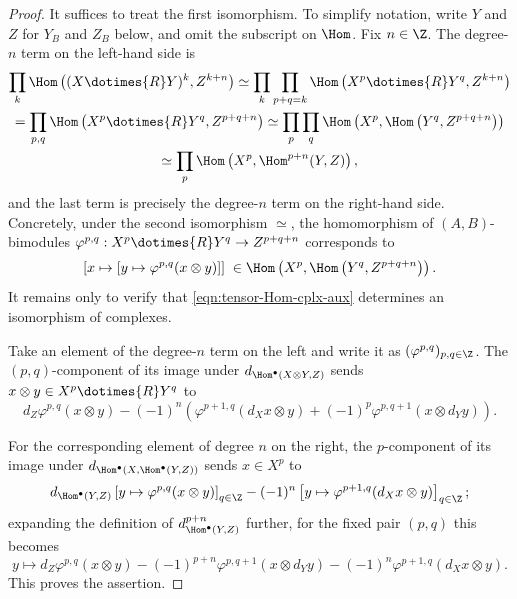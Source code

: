 \begin{proof}
	It suffices to treat the first isomorphism. To simplify notation, write
	$Y$ and $Z$ for $Y_B$ and $Z_B$ below, and omit the subscript on $\Hom$.
	Fix $n\in\Z$. The degree-$n$ term on the left-hand side is
	\begin{multline}\label{eqn:tensor-Hom-cplx-aux}
		\prod_k \Hom\left( (X \dotimes{R} Y)^k, Z^{k+n}\right) \simeq \prod_k \prod_{p+q=k} \Hom\left(X^p \dotimes{R} Y^q, Z^{k+n}\right) \\
		= \prod_{p, q} \Hom\left( X^p \dotimes{R} Y^q, Z^{p+q+n} \right) \simeq \prod_p \prod_q \Hom\left( X^p, \Hom\left(Y^q, Z^{p+q+n}\right) \right) \\
		\simeq \prod_p \Hom\left( X^p, \Hom^{p+n}(Y, Z) \right),
	\end{multline}
	and the last term is precisely the degree-$n$ term on the right-hand side.
	Concretely, under the second isomorphism $\simeq$, the homomorphism of
	$(A,B)$-bimodules
	$\varphi^{p,q}:X^p\dotimes{R}Y^q\to Z^{p+q+n}$ corresponds to
	\[ \left[ x \mapsto [y \mapsto \varphi^{p,q}(x \otimes y)] \right] \; \in \Hom\left( X^p, \Hom\left(Y^q, Z^{p+q+n}\right) \right). \]
	It remains only to verify that \eqref{eqn:tensor-Hom-cplx-aux} determines an
	isomorphism of complexes.

	Take an element of the degree-$n$ term on the left and write it as
	$(\varphi^{p,q})_{p,q\in\Z}$. The $(p,q)$-component of its image under
	$d_{\Hom^\bullet(X\otimes Y,Z)}$ sends
	$x\otimes y\in X^p\dotimes{R}Y^q$ to
	\[ d_Z \varphi^{p,q}(x \otimes y) - (-1)^n \left( \varphi^{p+1, q}(d_X x \otimes y) + (-1)^p \varphi^{p, q+1}(x \otimes d_Y y) \right). \]

	For the corresponding element of degree $n$ on the right, the
	$p$-component of its image under
	$d_{\Hom^\bullet(X,\Hom^\bullet(Y,Z))}$ sends $x\in X^p$ to
	\[
		d_{\Hom^\bullet(Y, Z)}\left[ y \mapsto \varphi^{p,q}(x \otimes y) \right]_{q \in \Z} - (-1)^n \left[ y \mapsto \varphi^{p+1, q}(d_X x \otimes y) \right]_{q \in \Z};
	\]
	expanding the definition of $d^{p+n}_{\Hom^\bullet(Y,Z)}$ further, for
	the fixed pair $(p,q)$ this becomes
	\[ y \mapsto d_Z \varphi^{p,q}(x \otimes y) - (-1)^{p+n} \varphi^{p, q+1}(x \otimes d_Y y) - (-1)^n \varphi^{p+1, q}(d_X x \otimes y). \]
	This proves the assertion.
\end{proof}


